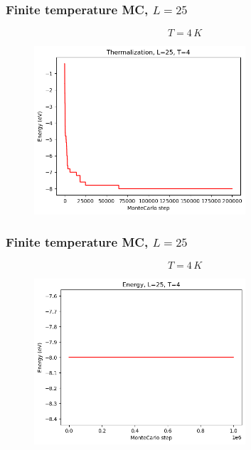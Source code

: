 \documentclass{beamer}
\begin{document}
\begin{frame}
    \frametitle{Finite temperature MC, $L=25$}

    $$T=4\,K$$

    \begin{figure}
        \includegraphics[width=0.7\textwidth]{images/cterm25T4.png}
    \end{figure}

\end{frame}

\begin{frame}
    \frametitle{Finite temperature MC, $L=25$}

    $$T=4\,K$$

    \begin{figure}
        \includegraphics[width=0.7\textwidth]{images/cenergy25T4.png}
    \end{figure}

\end{frame}
\end{document}
